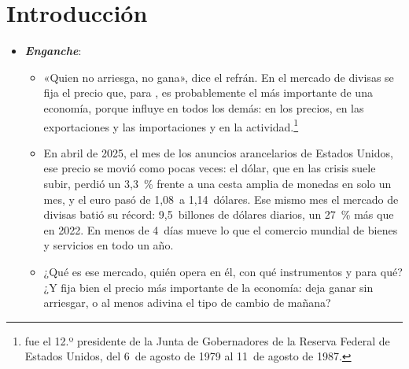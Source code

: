 \documentclass[11pt]{article}
\begin{document}
\tceetitulo

\section*{Introducción}

\begin{itemize}
\item \textbf{\emph{Enganche}}:
  \begin{itemize}
  \item «Quien no arriesga, no gana», dice el refrán. En el mercado de divisas se fija el precio que, para , es probablemente el más importante de una economía, porque influye en todos los demás: en los precios, en las exportaciones y las importaciones y en la actividad\nocite{VolckerGyohten1992}.\footnote{ fue el 12.º presidente de la Junta de Gobernadores de la Reserva Federal de Estados Unidos, del 6~de agosto de 1979 al 11~de agosto de 1987\nocite{FedHistory2026Volcker}.}
  \item En abril de 2025, el mes de los anuncios arancelarios de Estados Unidos, ese precio se movió como pocas veces: el dólar, que en las crisis suele subir, perdió un 3,3~\% frente a una cesta amplia de monedas en solo un mes\nocite{Fed2026DolarAmplio}, y el euro pasó de 1,08~a 1,14~dólares\nocite{BCE2026EURUSD}. Ese mismo mes el mercado de divisas batió su récord: 9,5~billones de dólares diarios, un 27~\% más que en 2022\nocite{BIS2026TrienalDatos,HuangKrohnSushko2025FX}. En menos de 4~días mueve lo que el comercio mundial de bienes y servicios en todo un año\nocite{OMC2026GTOS}.
  \item ¿Qué es ese mercado, quién opera en él, con qué instrumentos y para qué? ¿Y fija bien el precio más importante de la economía: deja ganar sin arriesgar, o al menos adivina el tipo de cambio de mañana?
  \end{itemize}


\end{itemize}
\end{document}
